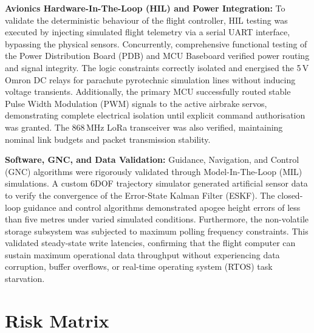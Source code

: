 \documentclass[11pt,a4paper]{article}
\begin{document}
\textbf{Avionics Hardware-In-The-Loop (HIL) and Power Integration:} To validate the deterministic behaviour of the flight controller, HIL testing was executed by injecting simulated flight telemetry via a serial UART interface, bypassing the physical sensors. Concurrently, comprehensive functional testing of the Power Distribution Board (PDB) and MCU Baseboard verified power routing and signal integrity. The logic constraints correctly isolated and energised the 5\,V Omron DC relays for parachute pyrotechnic simulation lines without inducing voltage transients. Additionally, the primary MCU successfully routed stable Pulse Width Modulation (PWM) signals to the active airbrake servos, demonstrating complete electrical isolation until explicit command authorisation was granted. The 868\,MHz LoRa transceiver was also verified, maintaining nominal link budgets and packet transmission stability.
\newline

\textbf{Software, GNC, and Data Validation:} Guidance, Navigation, and Control (GNC) algorithms were rigorously validated through Model-In-The-Loop (MIL) simulations. A custom 6DOF trajectory simulator generated artificial sensor data to verify the convergence of the Error-State Kalman Filter (ESKF). The closed-loop guidance and control algorithms demonstrated apogee height errors of less than five metres under varied simulated conditions. Furthermore, the non-volatile storage subsystem was subjected to maximum polling frequency constraints. This validated steady-state write latencies, confirming that the flight computer can sustain maximum operational data throughput without experiencing data corruption, buffer overflows, or real-time operating system (RTOS) task starvation.

\newpage
\nocite{*} 

\printbibliography[heading=bibintoc, title={Bibliography}]


\newpage
\appendix
\section{Risk Matrix}
\end{document}
